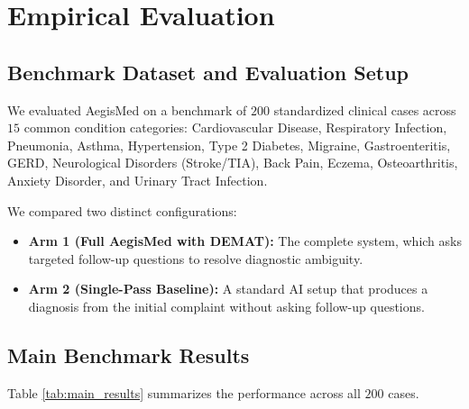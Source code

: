 \documentclass[10pt,twocolumn]{article}
\begin{document}
\section{Empirical Evaluation}

\subsection{Benchmark Dataset and Evaluation Setup}
We evaluated AegisMed on a benchmark of $200$ standardized clinical cases across $15$ common condition categories: Cardiovascular Disease, Respiratory Infection, Pneumonia, Asthma, Hypertension, Type 2 Diabetes, Migraine, Gastroenteritis, GERD, Neurological Disorders (Stroke/TIA), Back Pain, Eczema, Osteoarthritis, Anxiety Disorder, and Urinary Tract Infection.

We compared two distinct configurations:
\begin{itemize}
    \item \textbf{Arm 1 (Full AegisMed with DEMAT):} The complete system, which asks targeted follow-up questions to resolve diagnostic ambiguity.
    \item \textbf{Arm 2 (Single-Pass Baseline):} A standard AI setup that produces a diagnosis from the initial complaint without asking follow-up questions.
\end{itemize}

\subsection{Main Benchmark Results}
Table \ref{tab:main_results} summarizes the performance across all $200$ cases.
\end{document}
